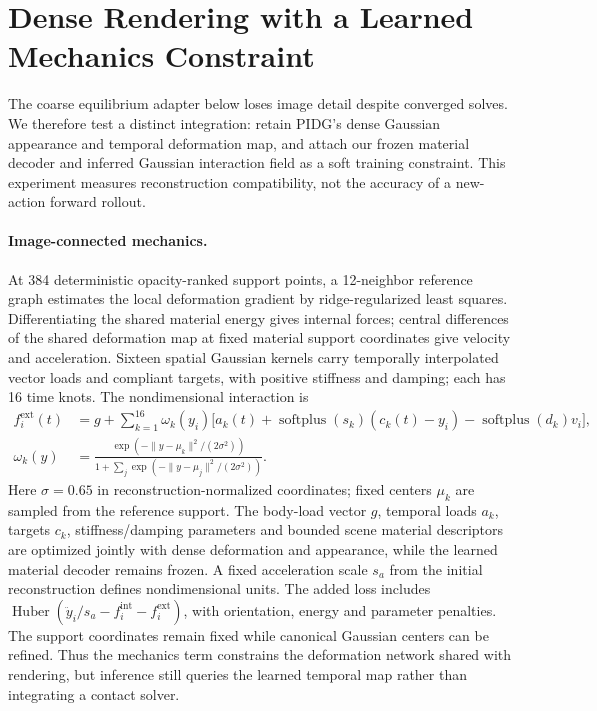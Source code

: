 \section{Dense Rendering with a Learned Mechanics Constraint}
\label{sec:pidg-dense}
The coarse equilibrium adapter below loses image detail despite converged solves. We therefore test a distinct integration: retain PIDG's dense Gaussian appearance and temporal deformation map, and attach our frozen material decoder and inferred Gaussian interaction field as a soft training constraint. This experiment measures reconstruction compatibility, not the accuracy of a new-action forward rollout.

\paragraph{Image-connected mechanics.}
At 384 deterministic opacity-ranked support points, a 12-neighbor reference graph estimates the local deformation gradient by ridge-regularized least squares. Differentiating the shared material energy gives internal forces; central differences of the shared deformation map at fixed material support coordinates give velocity and acceleration. Sixteen spatial Gaussian kernels carry temporally interpolated vector loads and compliant targets, with positive stiffness and damping; each has 16 time knots. The nondimensional interaction is
\begin{equation}
\begin{aligned}
 f_i^{\mathrm{ext}}(t)&=g+\sum_{k=1}^{16}\omega_k(y_i)
 \big[a_k(t)+\operatorname{softplus}(s_k)(c_k(t)-y_i)-\operatorname{softplus}(d_k)v_i\big],\\
 \omega_k(y)&=\frac{\exp(-\|y-\mu_k\|^2/(2\sigma^2))}{1+\sum_j\exp(-\|y-\mu_j\|^2/(2\sigma^2))}.
\end{aligned}
\end{equation}
Here $\sigma=0.65$ in reconstruction-normalized coordinates; fixed centers $\mu_k$ are sampled from the reference support. The body-load vector $g$, temporal loads $a_k$, targets $c_k$, stiffness/damping parameters and bounded scene material descriptors are optimized jointly with dense deformation and appearance, while the learned material decoder remains frozen. A fixed acceleration scale $s_a$ from the initial reconstruction defines nondimensional units. The added loss includes $\operatorname{Huber}(\ddot y_i/s_a-f_i^{\mathrm{int}}-f_i^{\mathrm{ext}})$, with orientation, energy and parameter penalties. The support coordinates remain fixed while canonical Gaussian centers can be refined. Thus the mechanics term constrains the deformation network shared with rendering, but inference still queries the learned temporal map rather than integrating a contact solver.


